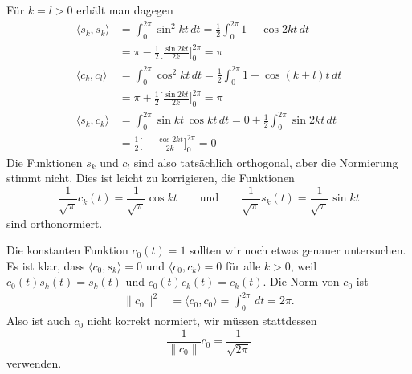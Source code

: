 Für $k=l>0$ erhält man dagegen
\begin{align*}
\langle s_k, s_k\rangle
&=
\int_0^{2\pi} \sin^2 kt \,dt
=
\frac12\int_0^{2\pi} 1 - \cos2kt\,dt
\\
&=
\pi
-
\frac12\biggl[ \frac{\sin2kt}{2k} \biggr]_0^{2\pi}
=
\pi
\\
\langle c_k, c_l\rangle
&=
\int_0^{2\pi} \cos^2 kt \,dt
=
\frac12\int_0^{2\pi} 1 + \cos(k+l)t\,dt
\\
&=
\pi
+
\frac12\biggl[ \frac{\sin 2kt}{2k}\biggr]_0^{2\pi}
=
\pi
\\
\langle s_k, c_k\rangle
&=
\int_0^{2\pi} \sin kt\, \cos kt \,dt
=
0
+
\frac12\int_0^{2\pi} \sin 2k t\,dt
\\
&=
\frac12\biggl[-\frac{\cos2kt}{2k}\biggr]_0^{2\pi}
=
0
\end{align*}
Die Funktionen $s_k$ und $c_l$ sind also tatsächlich orthogonal, aber
die Normierung stimmt nicht.
Dies ist leicht zu korrigieren, die Funktionen
\[
\frac1{\sqrt{\pi}} c_k(t) = \frac{1}{\sqrt{\pi}} \cos kt
\qquad\text{und}\qquad
\frac1{\sqrt{\pi}} s_k(t) = \frac{1}{\sqrt{\pi}} \sin kt
\]
sind orthonormiert.

Die konstanten Funktion $c_0(t)=1$ sollten wir noch etwas genauer untersuchen.
Es ist klar, dass $\langle c_0,s_k\rangle = 0$ und $\langle c_0,c_k\rangle=0$
für alle $k>0$, weil $c_0(t)s_k(t)=s_k(t)$ und $c_0(t)c_k(t)=c_k(t)$.
Die Norm von $c_0$ ist
\begin{align*}
\|c_0\|^2&=\langle c_0,c_0\rangle = \int_0^{2\pi}\,dt = 2\pi.
\end{align*}
Also ist auch $c_0$ nicht korrekt normiert, wir müssen stattdessen
\[
\frac1{\|c_0\|}c_0 = \frac{1}{\sqrt{2\pi}}
\]
verwenden.

